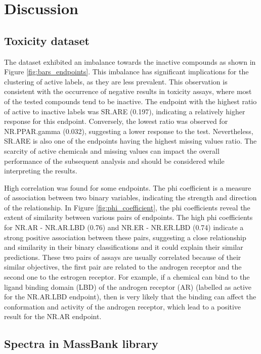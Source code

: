 \chapter{Discussion}

\section*{Toxicity dataset}

The dataset exhibited an imbalance towards the inactive compounds as shown in Figure \ref{fig:bars_endpoints}. This imbalance has significant implications for the clustering of active labels, as they are less prevalent. This observation is consistent with the occurrence of negative results in toxicity assays, where most of the tested compounds tend to be inactive. The endpoint with the highest ratio of active to inactive labels was SR.ARE (0.197), indicating a relatively higher response for this endpoint. Conversely, the lowest ratio was observed for NR.PPAR.gamma (0.032), suggesting a lower response to the test. Nevertheless, SR.ARE is also one of the endpoints having the highest missing values ratio. The scarcity of active chemicals and missing values can impact the overall performance of the subsequent analysis and should be considered while interpreting the results.

High correlation was found for some endpoints. The phi coefficient is a measure of association between two binary variables, indicating the strength and direction of the relationship. In Figure \ref{fig:phi_coefficient}, the phi coefficients reveal the extent of similarity between various pairs of endpoints. The high phi coefficients for NR.AR - NR.AR.LBD (0.76) and NR.ER - NR.ER.LBD (0.74) indicate a strong positive association between these pairs, suggesting a close relationship and similarity in their binary classifications and it could explain their similar predictions. These two pairs of assays are usually correlated because of their similar objectives, the first pair are related to the androgen receptor and the second one to the estrogen receptor. For example, if a chemical can bind to the ligand binding domain (LBD) of the androgen receptor (AR) (labelled as active for the NR.AR.LBD endpoint), then is very likely that the binding can affect the conformation and activity of the androgen receptor, which lead to a positive result for the NR.AR endpoint.


\section*{Spectra in MassBank library}

